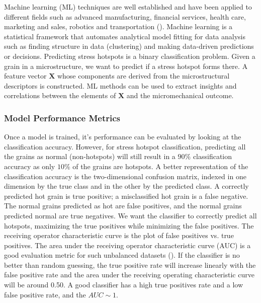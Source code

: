 \documentclass[preprint,1p,times,authoryear]{elsarticle}%
\begin{document}

Machine learning (ML) techniques are well established and have been applied to different fields such as advanced manufacturing, financial services, health care, marketing and sales, robotics and transportation (\cite{LeCun2015, Mangal2017a}). Machine learning is a statistical framework that automates analytical model fitting for data analysis such as finding structure in data (clustering) and making data-driven predictions or decisions. Predicting stress hotspots is a binary classification problem. Given a grain in a microstructure, we want to predict if a stress hotspot forms there. A feature vector $\mathbf{X}$ whose components are derived from the microstructural descriptors is constructed. ML methods can be used to extract insights and correlations between the elements of $\mathbf{X}$ and the micromechanical outcome. 

\subsubsection{Model Performance Metrics}
Once a model is trained, it's performance can be evaluated by looking at the classification accuracy. However, for stress hotspot classification, predicting all the grains as normal (non-hotspots) will still result in a $90\%$ classification accuracy as only $10  \%$ of the grains are hotspots.  A better representation of the classification accuracy is the two-dimensional confusion matrix, indexed in one dimension by the true class and in the other by the predicted class. A correctly predicted hot grain is true positive; a misclassified hot grain is a false negative. The normal grains predicted as hot are false positives, and the normal grains predicted normal are true negatives. We want the classifier to correctly predict all hotspots, maximizing the true positives while minimizing the false positives. The receiving operator characteristic curve is the plot of false positives vs. true positives. The area under the receiving operator characteristic curve (AUC) is a good evaluation metric for such unbalanced datasets (\cite{auc}). If the classifier is no better than random guessing, the true positive rate will increase linearly with the false positive rate and the area under the receiving operating characteristic curve will be around 0.50. A good classifier has a high true positives rate and a low false positive rate, and the $AUC \sim 1$.
\end{document}
